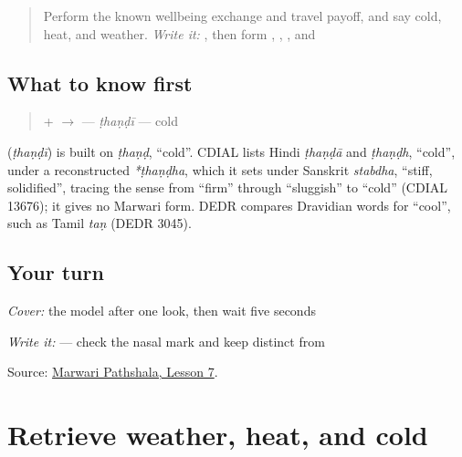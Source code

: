 \begin{quote}
Perform the known wellbeing exchange and travel payoff, and say cold, heat, and weather. \emph{Write it:} \textbf{}, then form \textbf{}, \textbf{}, \textbf{}, and \textbf{}
\end{quote}

\subsection*{What to know first}
\begin{quote}
\textbf{} + \textbf{} $\to$ \textbf{} — \emph{ṭhaṇḍī} — cold
\end{quote}

\begin{cousinweb}
\textbf{} (\emph{ṭhaṇḍī}) is built on \emph{ṭhaṇḍ}, \textquotedblleft{}cold\textquotedblright{}. CDIAL lists Hindi \emph{ṭhaṇḍā} and \emph{ṭhaṇḍh}, \textquotedblleft{}cold\textquotedblright{}, under a reconstructed \emph{*ṭhaṇḍha}, which it sets under Sanskrit \emph{stabdha}, \textquotedblleft{}stiff, solidified\textquotedblright{}, tracing the sense from \textquotedblleft{}firm\textquotedblright{} through \textquotedblleft{}sluggish\textquotedblright{} to \textquotedblleft{}cold\textquotedblright{} (CDIAL 13676); it gives no Marwari form. DEDR compares Dravidian words for \textquotedblleft{}cool\textquotedblright{}, such as Tamil \emph{taṇ} (DEDR 3045).
\end{cousinweb}

\subsection*{Your turn}
\emph{Cover:} the model after one look, then wait five seconds

\emph{Write it:} \textbf{} — check the nasal mark and keep \textbf{} distinct from \textbf{}

\begin{tcolorbox}[breakable,colback=teal!4,colframe=teal!35!black,title={Before you move on}]
Source: \href{https://www.marwaripathshala.com/marwari-lesson-7-english}{Marwari Pathshala, Lesson 7}.
\end{tcolorbox}
\section[Practice]{Retrieve weather, heat, and cold}

\label{lesson:MW-R12-weather-new-three}




